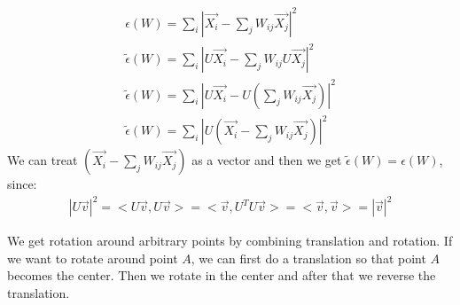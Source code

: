 \begin{gather*}
\epsilon(W) = \sum_{i} |\vec{X_{i}} - \sum_j W_{ij} \vec{X_{j}}| ^{2} \\
\tilde{\epsilon}(W) = \sum_{i} |U\vec{X_{i}} - \sum_j W_{ij} U\vec{X_{j}}| ^{2} \\
\tilde{\epsilon}(W) = \sum_{i} |U\vec{X_{i}} - U(\sum_j W_{ij} \vec{X_{j}})| ^{2} \\
\tilde{\epsilon}(W) = \sum_{i} |U(\vec{X_{i}} - \sum_j W_{ij} \vec{X_{j}})| ^{2}
\end{gather*}
We can treat $(\vec{X_{i}} - \sum_j W_{ij} \vec{X_{j}})$ as a vector and then we get $\tilde{\epsilon}(W) = \epsilon(W)$, since:
\begin{gather*}
|U\vec{v}|^2 = <U\vec{v}, U\vec{v}> = <\vec{v}, U^T U\vec{v}> = <\vec{v}, \vec{v}> = |\vec{v}|^2
\end{gather*}

We get rotation around arbitrary points by combining translation and rotation. If we want to rotate around point $A$, we can first do a translation so that point $A$ becomes the center. Then we rotate in the center and after that we reverse the translation.

\clearpage

